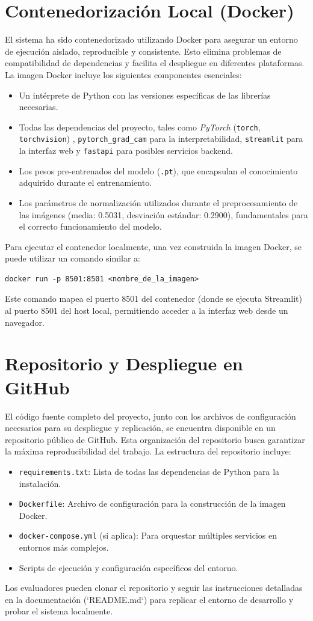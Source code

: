\section{Contenedorización Local (Docker)}
El sistema ha sido contenedorizado utilizando Docker para asegurar un entorno de ejecución aislado, reproducible y consistente. Esto elimina problemas de compatibilidad de dependencias y facilita el despliegue en diferentes plataformas. La imagen Docker incluye los siguientes componentes esenciales:
\begin{itemize}
    \item Un intérprete de Python con las versiones específicas de las librerías necesarias.
    \item Todas las dependencias del proyecto, tales como \textit{PyTorch} (\texttt{torch}, \texttt{torchvision}) \cite{paszkePyTorch2019}, \texttt{pytorch\_grad\_cam} para la interpretabilidad, \texttt{streamlit} para la interfaz web y \texttt{fastapi} para posibles servicios backend.
    \item Los pesos pre-entrenados del modelo (\texttt{.pt}), que encapsulan el conocimiento adquirido durante el entrenamiento.
    \item Los parámetros de normalización utilizados durante el preprocesamiento de las imágenes (media: 0.5031, desviación estándar: 0.2900), fundamentales para el correcto funcionamiento del modelo.
\end{itemize}
Para ejecutar el contenedor localmente, una vez construida la imagen Docker, se puede utilizar un comando similar a:
\begin{verbatim}
docker run -p 8501:8501 <nombre_de_la_imagen>
\end{verbatim}
Este comando mapea el puerto 8501 del contenedor (donde se ejecuta Streamlit) al puerto 8501 del host local, permitiendo acceder a la interfaz web desde un navegador.

\section{Repositorio y Despliegue en GitHub}
El código fuente completo del proyecto, junto con los archivos de configuración necesarios para su despliegue y replicación, se encuentra disponible en un repositorio público de GitHub. Esta organización del repositorio busca garantizar la máxima reproducibilidad del trabajo.
La estructura del repositorio incluye:
\begin{itemize}
    \item \texttt{requirements.txt}: Lista de todas las dependencias de Python para la instalación.
    \item \texttt{Dockerfile}: Archivo de configuración para la construcción de la imagen Docker.
    \item \texttt{docker-compose.yml} (si aplica): Para orquestar múltiples servicios en entornos más complejos.
    \item Scripts de ejecución y configuración específicos del entorno.
\end{itemize}
Los evaluadores pueden clonar el repositorio y seguir las instrucciones detalladas en la documentación (`README.md`) para replicar el entorno de desarrollo y probar el sistema localmente.
